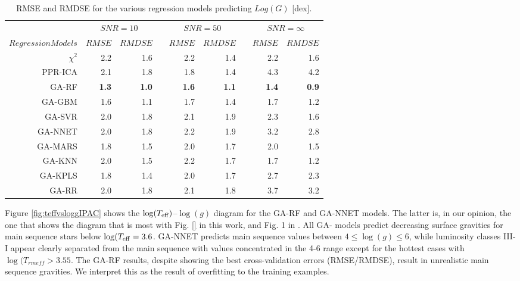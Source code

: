 \begin{table}\centering
\begin{tabular}{@{}rrrcrrcrr@{}}\toprule
& \multicolumn{2}{c}{$SNR = 10$} & \phantom{ab}& \multicolumn{2}{c}{$SNR = 50$} &
\phantom{ab} & \multicolumn{2}{c}{$SNR = \infty$}\\
\cmidrule{2-3} \cmidrule{5-6} \cmidrule{8-9}
$Regression Models$ & $RMSE$ & $RMDSE$ && $RMSE$ & $RMDSE$     && $RMSE$       & $RMDSE$ \\ \midrule
$\chi^2$    & 2.2       & 1.6       && 2.2       & 1.4       && 2.2       & 1.6 \\
PPR-ICA     & 2.1       & 1.8       && 1.8       & 1.4       && 4.3       & 4.2 \\
GA-RF       & {\bf 1.3} & {\bf 1.0} && {\bf 1.6} & {\bf 1.1} && {\bf 1.4} & {\bf 0.9} \\
GA-GBM      & 1.6       & 1.1       && 1.7       & 1.4       && 1.7       & 1.2 \\
GA-SVR      & 2.0       & 1.8       && 2.1       & 1.9       && 2.3       & 1.6 \\
GA-NNET     & 2.0       & 1.8       && 2.2       & 1.9       && 3.2       & 2.8 \\
GA-MARS     & 1.8       & 1.5       && 2.0       & 1.7       && 2.0       & 1.5 \\
GA-KNN      & 2.0       & 1.5       && 2.2       & 1.7       && 1.7       & 1.2 \\
GA-KPLS     & 1.8       & 1.4       && 2.0       & 1.7       && 2.7       & 2.3 \\
GA-RR       & 2.0       & 1.8       && 2.1       & 1.8       && 3.7       & 3.2 \\

\bottomrule
\end{tabular}
\caption {RMSE and RMDSE for the various regression models predicting $Log(G)$ [dex].} 
\label{tab:models_G_rmse} 
\end{table}

Figure \ref{fig:teffvsloggIPAC} shows the $\log(T_{\rm
  eff})$--$\log(g)$ diagram for the GA-RF and GA-NNET models. The
latter is, in our opinion, the one that shows the diagram that is most
with Fig. \ref{} in this work, and Fig. 1 in \cite{cesetti}. All GA-
models predict decreasing surface gravities for main sequence stars
below $\log(T_{\rm eff}=3.6$. GA-NNET predicts main sequence values
between $4 \le \log(g) \le6$, while luminosity classes III-I appear
clearly separated from the main sequence with values concentrated in
the 4-6 range except for the hottest cases with $\log(T_{rm eff} >
3.55$. The GA-RF results, despite showing the best cross-validation
errors (RMSE/RMDSE), result in unrealistic main sequence gravities. We
interpret this as the result of overfitting to the training examples. 

